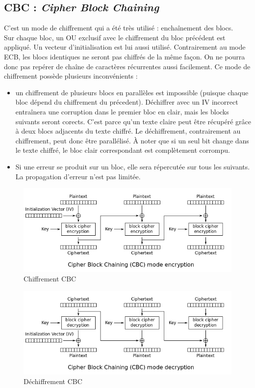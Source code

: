 \subsection{CBC : \textit{Cipher Block Chaining}}
C'est un mode de chiffrement qui a été très utilisé : enchaînement des blocs.\\
Sur chaque bloc, un OU exclusif avec le chiffrement du bloc précédent est appliqué. Un vecteur d'initialisation est lui aussi utilisé. Contrairement au mode ECB, les blocs identiques ne seront pas chiffrés de la même façon. On ne pourra donc pas repérer de chaîne de caractères récurrentes aussi facilement. Ce mode de chiffrement possède plusieurs inconvénients : 
\begin{itemize}
	\item un chiffrement de plusieurs blocs en parallèles est impossible (puisque chaque bloc dépend du chiffrement du précedent). Déchiffrer avec un IV incorrect entraînera une corruption dans le premier bloc en clair, mais les blocks suivants seront corects. C'est parce qu'un texte claire peut être récupéré grâce à deux blocs adjacents du texte chiffré. Le déchiffrement, contrairement au chiffrement, peut donc être parallélisé. À noter que si un seul bit change dans le texte chiffré, le bloc clair correspondant est complètement corrompu.
	\item Si une erreur se produit sur un bloc, elle sera répercutée sur tous les suivants. La propagation d'erreur n'est pas limitée.
\end{itemize} 
\begin{figure}[H]
	\centering
	\includegraphics[width=13cm]{images/CBC_chiff.png}
	\caption{Chiffrement CBC}
	\label{CBC_chiff}
\end{figure}

\begin{figure}[H]
	\centering
	\includegraphics[width=13cm]{images/CBC_dechiff.png}
	\caption{Déchiffrement CBC}
	\label{CBC_dechiff}
\end{figure}

